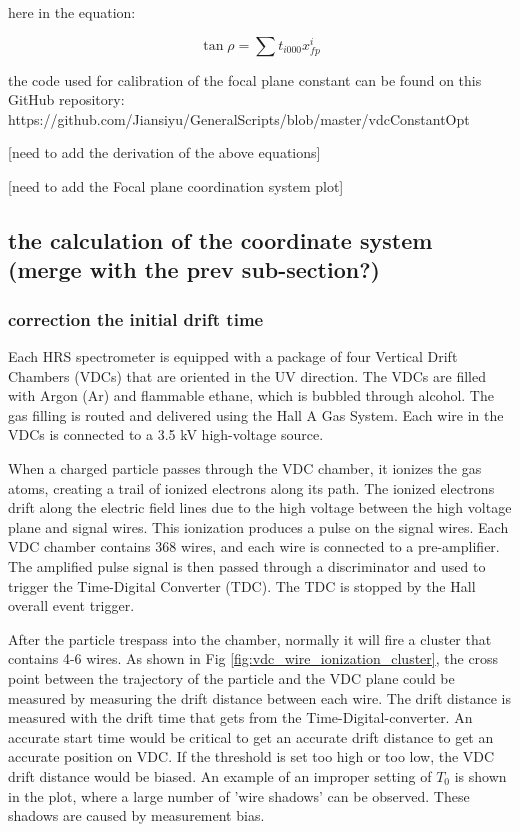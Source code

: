 here  in the equation:

\begin{equation}
    \tan\rho  = \sum t_{i000}x^i_{fp}
\end{equation}


the code used for calibration of the focal plane constant can be found on this GitHub repository: https://github.com/Jiansiyu/GeneralScripts/blob/master/vdcConstantOpt

[need to add the derivation of the above equations]

[need to add the Focal plane coordination system plot]

\subsection{the calculation of the coordinate system (merge with the prev sub-section?)}

\subsubsection{correction the initial drift time}
Each HRS spectrometer is equipped with a package of four Vertical Drift Chambers (VDCs) that are oriented in the UV direction. The VDCs are filled with Argon (Ar) and flammable ethane, which is bubbled through alcohol. The gas filling is routed and delivered using the Hall A Gas System. Each wire in the VDCs is connected to a 3.5 kV high-voltage source.

When a charged particle passes through the VDC chamber, it ionizes the gas atoms, creating a trail of ionized electrons along its path. The ionized electrons drift along the electric field lines due to the high voltage between the high voltage plane and signal wires. This ionization produces a pulse on the signal wires. Each VDC chamber contains 368 wires, and each wire is connected to a pre-amplifier. The amplified pulse signal is then passed through a discriminator and used to trigger the Time-Digital Converter (TDC). The TDC is stopped by the Hall overall event trigger.

After the particle trespass into the chamber, normally it will fire a cluster that contains 4-6 wires. As shown in Fig \ref{fig:vdc_wire_ionization_cluster}, the cross point between the trajectory of the particle and the VDC plane could be measured by measuring the drift distance between each wire. The drift distance is measured with the drift time that gets from the Time-Digital-converter. An accurate start time would be critical to get an accurate drift distance to get an accurate position on VDC.  If the threshold is set too high or too low, the VDC drift distance would be biased. An example of an improper setting of $T_0$ is shown in the plot, where a large number of 'wire shadows' can be observed. These shadows are caused by measurement bias.

